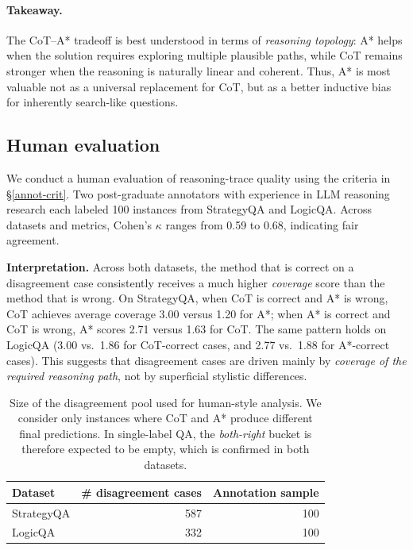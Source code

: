 \documentclass[11pt]{article}
\begin{document}
\paragraph{Takeaway.}
The CoT--A* tradeoff is best understood in terms of \emph{reasoning topology}: A* helps when the solution requires exploring multiple plausible paths, while CoT remains stronger when the reasoning is naturally linear and coherent. Thus, A* is most valuable not as a universal replacement for CoT, but as a better inductive bias for inherently search-like questions.


\subsection{Human evaluation}
We conduct a human evaluation of reasoning-trace quality using the criteria in \S\ref{annot-crit}. Two post-graduate annotators with experience in LLM reasoning research each labeled 100 instances from StrategyQA and LogicQA. Across datasets and metrics, Cohen's \(\kappa\) ranges from 0.59 to 0.68, indicating fair agreement.

\noindent\textbf{Interpretation.}
Across both datasets, the method that is correct on a disagreement case consistently receives a much higher \emph{coverage} score than the method that is wrong. On StrategyQA, when CoT is correct and A* is wrong, CoT achieves average coverage 3.00 versus 1.20 for A*; when A* is correct and CoT is wrong, A* scores 2.71 versus 1.63 for CoT. The same pattern holds on LogicQA (3.00 vs.\ 1.86 for CoT-correct cases, and 2.77 vs.\ 1.88 for A*-correct cases). This suggests that disagreement cases are driven mainly by \emph{coverage of the required reasoning path}, not by superficial stylistic differences.

\begin{table}[t]
\centering
\small
\begin{tabular}{lrr}
\toprule
Dataset & \# disagreement cases & Annotation sample \\
\midrule
StrategyQA & 587 & 100 \\
LogicQA     & 332 & 100 \\
\bottomrule
\end{tabular}
\caption{Size of the disagreement pool used for human-style analysis. We consider only instances where CoT and A* produce different final predictions. In single-label QA, the \textit{both-right} bucket is therefore expected to be empty, which is confirmed in both datasets.}
\label{tab:disagreement-pool}
\end{table}
\end{document}
